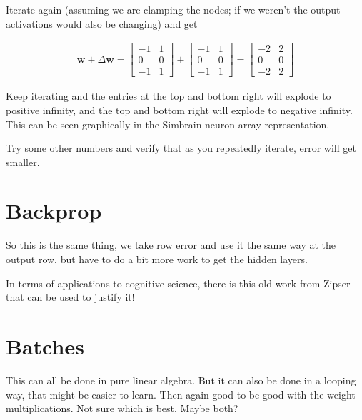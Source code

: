 Iterate again (assuming we are clamping the nodes; if we weren't the output activations would also be changing) and get


\begin{align*}
\mathbf{w} + \Delta \mathbf{w}  =
\begin{bmatrix} -1 & 1 \\ 0 & 0 \\  -1 & 1  \end{bmatrix} +
\begin{bmatrix} -1 & 1 \\ 0 & 0 \\  -1 & 1  \end{bmatrix} =
\begin{bmatrix} -2 & 2 \\ 0 & 0 \\  -2 & 2  \end{bmatrix}
\end{align*}

 Keep iterating and the entries at the top and bottom right will explode to positive infinity, and the top and bottom right will explode to negative infinity. This can be seen graphically in the Simbrain neuron array representation.
 
Try some other numbers and verify that as you repeatedly iterate, error will get smaller.



\section{Backprop}

So this is the same thing, we take row error and use it the same way at the output row, but have to do a bit more work to get the hidden layers.

In terms of applications to cognitive science, there is this old work from Zipser that can be used to justify it!

\section{Batches}

This can all be done in pure linear algebra. But it can also be done in a looping way, that might be easier to learn. Then again good to be good with the weight multiplications. Not sure which is best. Maybe both?
